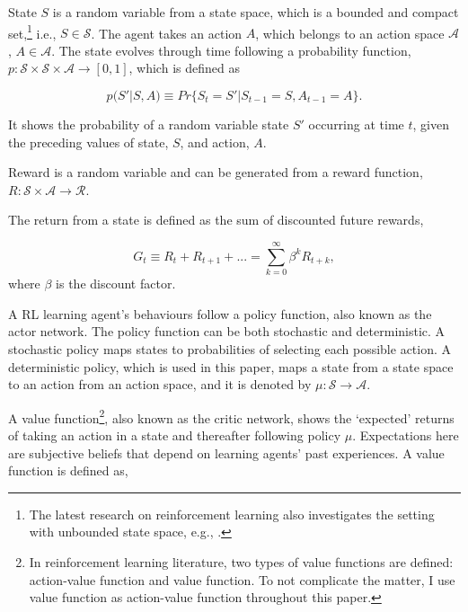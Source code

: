 \documentclass[hidelinks]{article}
\begin{document}
\vspace{1.5cm}

State $S$ is a random variable from a state space, which is a bounded and compact set,\footnote{The latest research on reinforcement learning also investigates the setting with unbounded state space, e.g., \cite{shah2020stable}.} i.e., $S \in \mathcal{S}$. The agent takes an action $A$, which belongs to an action space $\mathcal{A}$,  $A\in\mathcal{A}$. The state evolves through time following a probability function, $p: \mathcal{S} \times \mathcal{S} \times \mathcal{A} \rightarrow [0,1]$, which is defined as

\begin{equation}
	p(S'|S, A) \equiv Pr \{S_t = S' | S_{t-1} = S, A_{t-1} = A \}.
\end{equation}

It shows the probability of a random variable state $S'$ occurring at time $t$, given the preceding values of state, $S$, and action, $A$.

Reward is a random variable and can be generated from a reward function, $R: \mathcal{S} \times \mathcal{A} \rightarrow \mathcal{R}$.

The return from a state is defined as the sum of discounted future rewards,

\begin{equation}
	G_t \equiv R_{t} + R_{t+1} + ... = \sum_{k=0}^{\infty} \beta^k R_{t+k},
\end{equation}
where $\beta$ is the discount factor.


A RL learning agent's behaviours follow a policy function, also known as the actor network. The policy function can be both stochastic and deterministic. A stochastic policy maps states to probabilities of selecting each possible action. A deterministic policy, which is used in this paper, maps a state from a state space to an action from an action space, and it is denoted by $\mu: \mathcal{S} \rightarrow \mathcal{A}$.

A value function\footnote{In reinforcement learning literature, two types of value functions are defined: action-value function and value function. To not complicate the matter, I use value function as action-value function throughout this paper.}, also known as the critic network, shows the `expected' returns of taking an action in a state and thereafter following policy $\mu$. Expectations here are subjective beliefs that depend on learning agents' past experiences. A value function is defined as,
\end{document}
